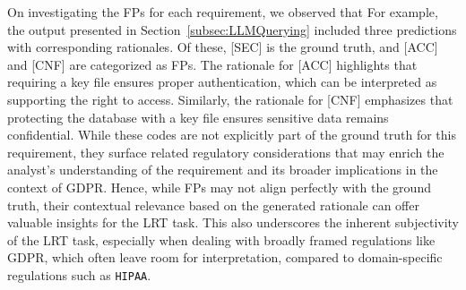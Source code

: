 On investigating the FPs for each requirement, we observed that %
For example, the \RICE output presented in Section~\ref{subsec:LLMQuerying} included three predictions with corresponding rationales. Of these, [SEC] is the ground truth, and [ACC] and [CNF] are categorized as FPs. The rationale for [ACC] highlights that requiring a key file ensures proper authentication, which can be interpreted as supporting the right to access. Similarly, the rationale for [CNF] emphasizes that protecting the database with a key file ensures sensitive data remains confidential. While these codes are not explicitly part of the ground truth for this requirement, they surface related regulatory considerations that may enrich the analyst's understanding of the requirement and its broader implications in the context of GDPR. Hence, while FPs may not align perfectly with the ground truth, their contextual relevance based on the generated rationale can offer valuable insights for the LRT task.
This also underscores the inherent subjectivity of the LRT task, especially when dealing with broadly framed regulations like GDPR, which often leave room for interpretation, compared to domain-specific regulations such as \texttt{HIPAA}. 
%

